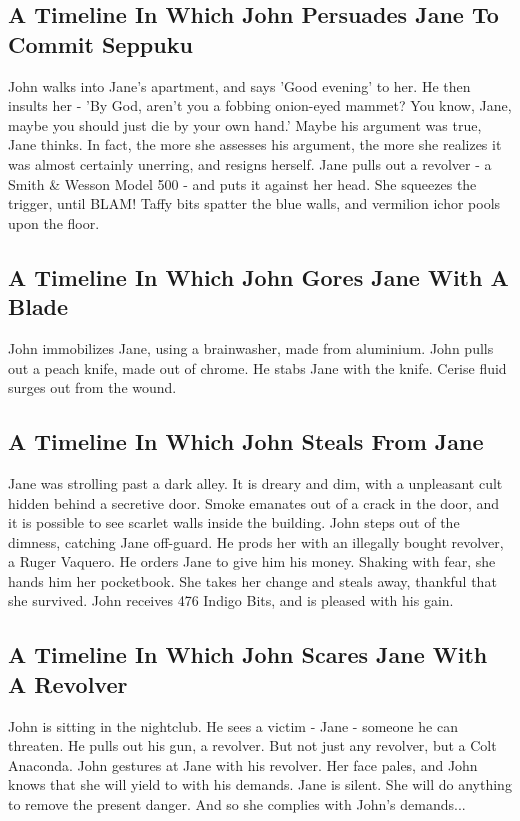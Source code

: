 \documentclass{article}
\begin{document}
\subsection{A Timeline In Which John Persuades Jane To Commit Seppuku}


John walks into Jane's apartment, and says 'Good evening' to her.
He then insults her {-} 'By God, aren't you a fobbing onion{-}eyed mammet?
You know, Jane, maybe you should just die by your own hand.'
Maybe his argument was true, Jane thinks.
In fact, the more she assesses his argument, the more she realizes it was almost certainly unerring, and resigns herself.
Jane pulls out a revolver {-} a Smith \& Wesson Model 500 {-} and puts it against her head.
She squeezes the trigger, until BLAM!
Taffy bits spatter the blue walls, and vermilion ichor pools upon the floor.
\subsection{A Timeline In Which John Gores Jane With A Blade}


John immobilizes Jane, using a brainwasher, made from aluminium.
John pulls out a peach knife, made out of chrome.
He stabs Jane with the knife.
Cerise fluid surges out from the wound.
\subsection{A Timeline In Which John Steals From Jane}


Jane was strolling past a dark alley.
It is dreary and dim, with a unpleasant cult hidden behind a secretive door.
Smoke emanates out of a crack in the door, and it is possible to see scarlet walls inside the building.
John steps out of the dimness, catching Jane off{-}guard.
He prods her with an illegally bought revolver, a Ruger Vaquero.
He orders Jane to give him his money.
Shaking with fear, she hands him her pocketbook.
She takes her change and steals away, thankful that she survived.
John receives 476 Indigo Bits, and is pleased with his gain.
\subsection{A Timeline In Which John Scares Jane With A Revolver}


John is sitting in the nightclub.
He sees a victim {-} Jane {-} someone he can threaten. He pulls out his gun, a revolver.
But not just any revolver, but a Colt Anaconda.
John gestures at Jane with his revolver. Her face pales, and John knows that she will yield to with his demands.
Jane is silent. She will do anything to remove the present danger. And so she complies with John's demands...
\end{document}

